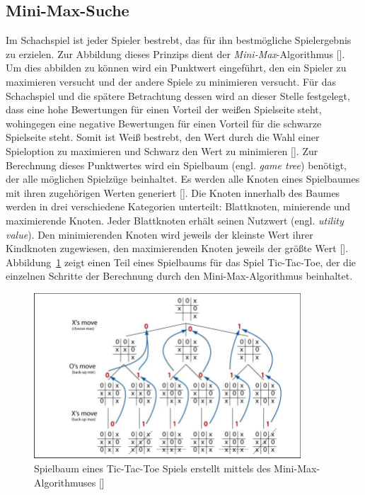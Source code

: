 \subsection{Mini-Max-Suche}

Im Schachspiel ist jeder Spieler bestrebt, das für ihn bestmögliche Spielergebnis zu erzielen.
Zur Abbildung dieses Prinzips dient der \textit{Mini-Max}-Algorithmus [\cite{Paulsen2009}].
Um dies abbilden zu können wird ein Punktwert eingeführt, den ein Spieler zu maximieren versucht und der andere Spiele zu minimieren versucht.
Für das Schachspiel und die spätere Betrachtung dessen wird an dieser Stelle festgelegt, dass eine hohe Bewertungen für einen Vorteil der weißen Spielseite steht, wohingegen eine negative Bewertungen für einen Vorteil für die schwarze Spielseite steht.
Somit ist Weiß bestrebt, den Wert durch die Wahl einer Spieloption zu maximieren und Schwarz den Wert zu minimieren [\cite{Paulsen2009}].
Zur Berechnung dieses Punktwertes wird ein Spielbaum (engl. \textit{game tree}) benötigt, der alle möglichen Spielzüge beinhaltet.
Es werden alle Knoten eines Spielbaumes mit ihren zugehörigen Werten generiert [\cite{Shah2007}].
Die Knoten innerhalb des Baumes werden in drei verschiedene Kategorien unterteilt: Blattknoten, minierende und maximierende Knoten.
Jeder Blattknoten erhält seinen Nutzwert (engl. \textit{utility value}).
Den minimierenden Knoten wird jeweils der kleinste Wert ihrer Kindknoten zugewiesen, den maximierenden Knoten jeweils der größte Wert [\cite{Shah2007}].
Abbildung~\ref{fig:minimax_tic-tac-toe} zeigt einen Teil eines Spielbaums für das Spiel Tic-Tac-Toe, der die einzelnen Schritte der Berechnung durch den Mini-Max-Algorithmus beinhaltet.

\begin{figure}
    \centering
    \includegraphics[width=0.89\textwidth]{images/theory/minimax_tic-tac-toe.png}
    \caption[Spielbaum eines Tic-Tac-Toe Spiels erstellt mittels des Mini-Max-Algorithmuses]{Spielbaum eines Tic-Tac-Toe Spiels erstellt mittels des Mini-Max-Algorithmuses [\cite{Elnaggar2014}]}
    \label{fig:minimax_tic-tac-toe}
\end{figure}

